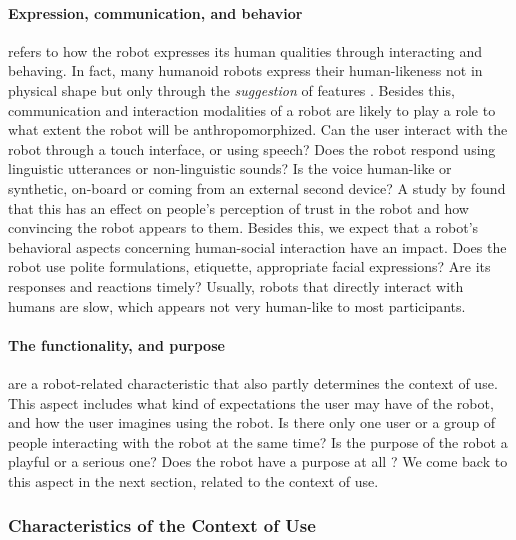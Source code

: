 \documentclass{frontiersSCNS} %
\begin{document}
\paragraph{Expression, communication, and behavior} refers to how the robot expresses its human qualities through interacting and behaving. In fact, many humanoid robots express their human-likeness not in physical shape but only through the \textit{suggestion} of features \citep{disalvo_all_2002}. Besides this, communication and interaction modalities of a robot are likely to play a role to what extent the robot will be anthropomorphized. Can the user interact with the robot through a touch interface, or using speech? Does the robot respond using linguistic utterances or non-linguistic sounds? Is the voice human-like or synthetic, on-board or coming from an external second device? A study by \cite{takayama_im_2009} found that this has an effect on people's perception of trust in the robot and how convincing the robot appears to them. Besides this, we expect that a robot's behavioral aspects concerning human-social interaction have an impact. Does the robot use polite formulations, etiquette, appropriate facial expressions? Are its responses and reactions timely? Usually, robots that directly interact with humans are slow, which appears not very human-like to most participants. 

\paragraph{The functionality, and purpose} are a robot-related characteristic that also partly determines the context of use. This aspect includes what kind of expectations the user may have of the robot, and how the user imagines using the robot. Is there only one user or a group of people interacting with the robot at the same time? Is the purpose of the robot a playful or a serious one? Does the robot have a purpose at all \citep{kaplan_free_2000}? We come back to this aspect in the next section, related to the context of use.



\subsubsection{Characteristics of the Context of Use\\}
\label{sec:factor-context}
\end{document}
